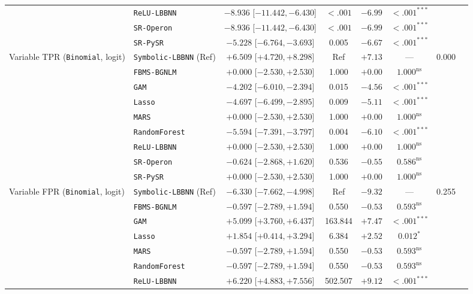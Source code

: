 \begin{table}[htbp]
{{\begin{tabular}{llcccccc}
 & \texttt{ReLU-LBBNN} & $-8.936$ [$-11.442, -6.430$] & $<.001$ & $-6.99$ & $<.001^{***}$ &  \\
 & \texttt{SR-Operon} & $-8.936$ [$-11.442, -6.430$] & $<.001$ & $-6.99$ & $<.001^{***}$ &  \\
 & \texttt{SR-PySR} & $-5.228$ [$-6.764, -3.693$] & 0.005 & $-6.67$ & $<.001^{***}$ &  \\
\midrule
Variable TPR (\texttt{Binomial}, logit) & \texttt{Symbolic-LBBNN} (Ref) & $+6.509$ [$+4.720, +8.298$] & Ref & $+7.13$ & --- & 0.000 \\
 & \texttt{FBMS-BGNLM} & $+0.000$ [$-2.530, +2.530$] & 1.000 & $+0.00$ & $1.000^{\text{ns}}$ &  \\
 & \texttt{GAM} & $-4.202$ [$-6.010, -2.394$] & 0.015 & $-4.56$ & $<.001^{***}$ &  \\
 & \texttt{Lasso} & $-4.697$ [$-6.499, -2.895$] & 0.009 & $-5.11$ & $<.001^{***}$ &  \\
 & \texttt{MARS} & $+0.000$ [$-2.530, +2.530$] & 1.000 & $+0.00$ & $1.000^{\text{ns}}$ &  \\
 & \texttt{RandomForest} & $-5.594$ [$-7.391, -3.797$] & 0.004 & $-6.10$ & $<.001^{***}$ &  \\
 & \texttt{ReLU-LBBNN} & $+0.000$ [$-2.530, +2.530$] & 1.000 & $+0.00$ & $1.000^{\text{ns}}$ &  \\
 & \texttt{SR-Operon} & $-0.624$ [$-2.868, +1.620$] & 0.536 & $-0.55$ & $0.586^{\text{ns}}$ &  \\
 & \texttt{SR-PySR} & $+0.000$ [$-2.530, +2.530$] & 1.000 & $+0.00$ & $1.000^{\text{ns}}$ &  \\
\midrule
Variable FPR (\texttt{Binomial}, logit) & \texttt{Symbolic-LBBNN} (Ref) & $-6.330$ [$-7.662, -4.998$] & Ref & $-9.32$ & --- & 0.255 \\
 & \texttt{FBMS-BGNLM} & $-0.597$ [$-2.789, +1.594$] & 0.550 & $-0.53$ & $0.593^{\text{ns}}$ &  \\
 & \texttt{GAM} & $+5.099$ [$+3.760, +6.437$] & 163.844 & $+7.47$ & $<.001^{***}$ &  \\
 & \texttt{Lasso} & $+1.854$ [$+0.414, +3.294$] & 6.384 & $+2.52$ & $0.012^{*}$ &  \\
 & \texttt{MARS} & $-0.597$ [$-2.789, +1.594$] & 0.550 & $-0.53$ & $0.593^{\text{ns}}$ &  \\
 & \texttt{RandomForest} & $-0.597$ [$-2.789, +1.594$] & 0.550 & $-0.53$ & $0.593^{\text{ns}}$ &  \\
 & \texttt{ReLU-LBBNN} & $+6.220$ [$+4.883, +7.556$] & 502.507 & $+9.12$ & $<.001^{***}$ &  \\

\end{tabular}}}
\end{table}
